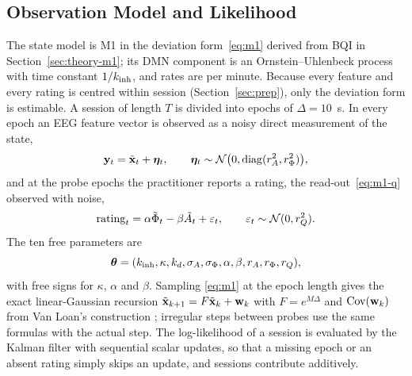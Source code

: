 \subsection{Observation Model and Likelihood}
\label{sec:model}
The state model is M1 in the deviation form~\eqref{eq:m1} derived from BQI in Section~\ref{sec:theory-m1}; its DMN component is an Ornstein--Uhlenbeck process \cite{UhlenbeckOrnstein1930} with time constant $1/k_{\mathrm{inh}}$, and rates are per minute. Because every feature and every rating is centred within session (Section~\ref{sec:prep}), only the deviation form is estimable. A session of length $T$ is divided into epochs of $\Delta=10$~s. In every epoch an EEG feature vector is observed as a noisy direct measurement of the state,
\begin{equation}
  \mathbf{y}_t=\tilde{\mathbf{x}}_t+\boldsymbol\eta_t,\qquad \boldsymbol\eta_t\sim\mathcal N\bigl(0,\operatorname{diag}(r_{A}^2,r_{\Phi}^2)\bigr),
  \label{eq:obsEEG}
\end{equation}
and at the probe epochs the practitioner reports a rating, the read-out~\eqref{eq:m1-q} observed with noise,
\begin{equation}
  \mathrm{rating}_t=\alpha\tilde\Phi_t-\beta\tilde A_t+\varepsilon_t,\qquad \varepsilon_t\sim\mathcal N(0,r_{Q}^2).
  \label{eq:obsRating}
\end{equation}
The ten free parameters are
\begin{equation*}
  \boldsymbol{\theta}=(k_{\mathrm{inh}},\kappa,k_{d},\sigma_{A},\sigma_{\Phi},\alpha,\beta,r_{A},r_{\Phi},r_{Q}),
\end{equation*}
with free signs for $\kappa$, $\alpha$ and $\beta$. Sampling \eqref{eq:m1} at the epoch length gives the exact linear-Gaussian recursion $\tilde{\mathbf{x}}_{k+1}=F\tilde{\mathbf{x}}_k+\mathbf w_k$ with $F=e^{M\Delta}$ and $\operatorname{Cov}(\mathbf w_k)$ from Van Loan's construction \cite{VanLoan1978}; irregular steps between probes use the same formulas with the actual step. The log-likelihood of a session is evaluated by the Kalman filter \cite{Kalman1960,Harvey1989,Durbin2012} with sequential scalar updates, so that a missing epoch or an absent rating simply skips an update, and sessions contribute additively.

